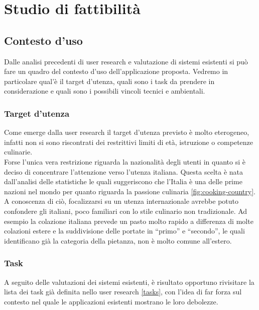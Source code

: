 \section{Studio di fattibilità}

\subsection{Contesto d'uso}
Dalle analisi precedenti di user research e valutazione di sistemi
esistenti si può fare un quadro del contesto d'uso dell'applicazione
proposta.
Vedremo in particolare qual'è il target d'utenza, quali sono i task da
prendere in considerazione e quali sono i possibili vincoli tecnici e
ambientali.

\subsubsection{Target d'utenza}
Come emerge dalla user research il target d'utenza previsto è molto
eterogeneo, infatti non si sono riscontrati dei restrittivi limiti di
età, istruzione o competenze culinarie.\\
Forse l'unica vera restrizione riguarda la nazionalità degli utenti
in quanto si è deciso di concentrare
l'attenzione verso l'utenza italiana. Questa scelta è nata dall'analisi
delle statistiche le quali suggeriscono che l'Italia è una delle
prime nazioni nel mondo per quanto riguarda la passione culinaria
\ref{fig:cooking-country}. A conoscenza di ciò, focalizzarsi su un
utenza internazionale avrebbe potuto confondere gli italiani, poco familiari
con lo stile culinario non tradizionale. Ad esempio la colazione
italiana prevede un pasto molto rapido a differenza di molte colazioni
estere e la suddivisione delle portate in ``primo'' e ``secondo'', le quali
identificano già la categoria della pietanza, non è molto comune
all'estero.

\subsubsection{Task}
A seguito delle valutazioni dei sistemi esistenti, è risultato opportuno
rivisitare la lista dei task già definita nello user research
\ref{tasks}, con
l'idea di far forza sul contesto nel quale le applicazioni esistenti
mostrano le loro debolezze.

